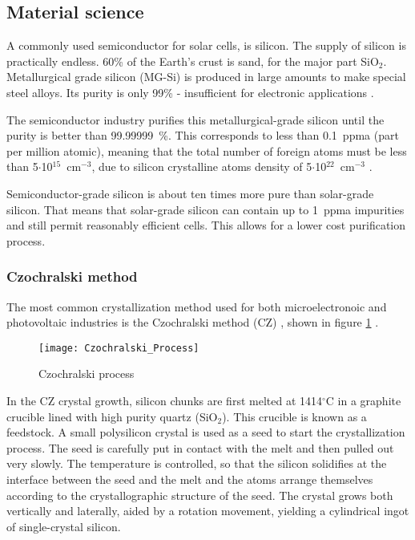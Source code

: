 \subsection{Material science}

A commonly used semiconductor for solar cells, is silicon. The supply of silicon is practically endless. 60\% of the Earth's crust is sand, for the major part SiO$_2$. Metallurgical grade silicon (MG-Si) is produced in large amounts to make special steel alloys. Its purity is only 99\% - insufficient for electronic applications \cite{solar_cells}. 

The semiconductor industry purifies this metallurgical-grade silicon until the purity is better than 99.99999~\%. This corresponds to less than 0.1~ppma (part per million atomic), meaning that the total number of foreign atoms must be less than 5$\cdot$10${^15}$~cm$^{-3}$, due to silicon crystalline atoms density of 5$\cdot$10$^{22}$~cm$^{-3}$ \cite{solar_cells}.

Semiconductor-grade silicon is about ten times more pure than solar-grade silicon. That means that solar-grade silicon can contain up to 1~ppma impurities and still permit reasonably efficient cells. This allows for a lower cost purification process.

\subsubsection{Czochralski method}

The most common crystallization method used for both microelectronoic and photovoltaic industries is the Czochralski method (CZ) ,  shown in figure \ref{fig:czochralski_process} \cite{solar_cells}.

\begin{figure}[H]
\texttt{[image: Czochralski\_Process]}%
\caption{Czochralski process}%
\label{fig:czochralski_process}%
\end{figure}

In the CZ crystal growth, silicon chunks are first melted at 1414$^\circ$C in a graphite crucible lined with high purity quartz (SiO$_2$). This crucible is known as a feedstock. A small polysilicon crystal is used as a seed to start the crystallization process. The seed is carefully put in contact with the melt and then pulled out very slowly. The temperature is controlled, so that the silicon solidifies at the interface between the seed and the melt and the atoms arrange themselves according to the crystallographic structure of the seed. The crystal grows both vertically and laterally, aided by a rotation movement, yielding a cylindrical ingot of single-crystal silicon. 

